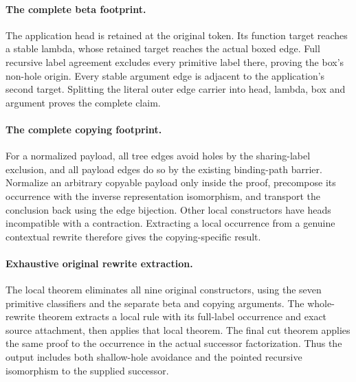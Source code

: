 \paragraph{The complete beta footprint.}
The application head is retained at the original token. Its function target
reaches a stable lambda, whose retained target reaches the actual boxed edge.
Full recursive label agreement excludes every primitive label there, proving
the box's non-hole origin. Every stable argument edge is adjacent to the
application's second target. Splitting the literal outer edge carrier into
head, lambda, box and argument proves the complete claim.


\paragraph{The complete copying footprint.}
For a normalized payload, all tree edges avoid holes by the sharing-label
exclusion, and all payload edges do so by the existing binding-path barrier.
Normalize an arbitrary copyable payload only inside the proof, precompose its
occurrence with the inverse representation isomorphism, and transport the
conclusion back using the edge bijection. Other local constructors have heads
incompatible with a contraction. Extracting a local occurrence from a genuine
contextual rewrite therefore gives the copying-specific result.


\paragraph{Exhaustive original rewrite extraction.}
The local theorem eliminates all nine original constructors, using the seven
primitive classifiers and the separate beta and copying arguments. The
whole-rewrite theorem extracts a local rule with its full-label occurrence
and exact source attachment, then applies that local theorem. The final cut
theorem applies the same proof to the occurrence in the actual successor
factorization. Thus the output includes both shallow-hole avoidance and the
pointed recursive isomorphism to the supplied successor.

